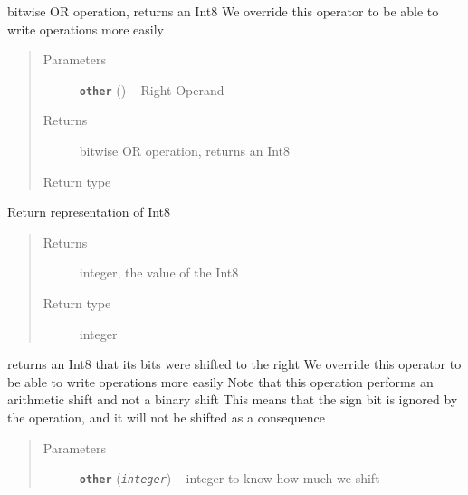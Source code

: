\documentclass[letterpaper,10pt,english]{sphinxmanual}
\begin{document}
\begin{fulllineitems}

\begin{fulllineitems}
\label{datatypes.integers:datatypes.integers.Int8.Int8.__or__}
bitwise OR operation, returns an Int8
We override this operator to be able to write operations more easily
\begin{quote}\begin{description}
\item[{Parameters}] \leavevmode
\textbf{\texttt{other}} ({\hyperref[datatypes.integers:datatypes.integers.Int8.Int8]{}}) -- Right Operand

\item[{Returns}] \leavevmode
bitwise OR operation, returns an Int8

\item[{Return type}] \leavevmode
{\hyperref[datatypes.integers:datatypes.integers.Int8.Int8]{}}

\end{description}\end{quote}

\end{fulllineitems}


\begin{fulllineitems}
\label{datatypes.integers:datatypes.integers.Int8.Int8.__repr__}
Return representation of Int8
\begin{quote}\begin{description}
\item[{Returns}] \leavevmode
integer, the value of the Int8

\item[{Return type}] \leavevmode
integer

\end{description}\end{quote}

\end{fulllineitems}


\begin{fulllineitems}
\label{datatypes.integers:datatypes.integers.Int8.Int8.__rshift__}
returns an Int8 that its bits were shifted to the right
We override this operator to be able to write operations more easily
Note that this operation performs an arithmetic shift and not a binary shift
This means that the sign bit is ignored by the operation, and it will not be shifted as a consequence
\begin{quote}\begin{description}
\item[{Parameters}] \leavevmode
\textbf{\texttt{other}} (\emph{\texttt{integer}}) -- integer to know how much we shift


\end{description}
\end{quote}
\end{fulllineitems}
\end{fulllineitems}
\end{document}
